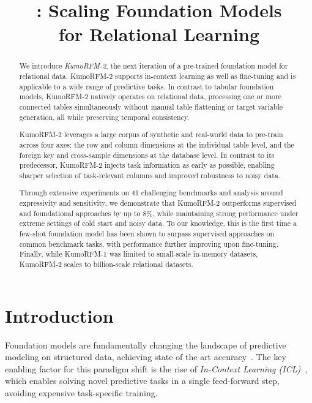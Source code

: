 \documentclass{article}
\title{
\nametwo{}: Scaling Foundation Models\\for Relational Learning
}
\newcommand{\onezero}{1\xspace}
\newcommand{\twozero}{2\xspace}
\newcommand{\name}{KumoRFM\xspace}
\newcommand{\nameone}{\name-\onezero}
\newcommand{\nametwo}{\name-\twozero}
\begin{document}
\maketitle

\begin{abstract}

We introduce \emph{\nametwo}, the next iteration of a pre-trained foundation model for relational data. \nametwo supports in-context learning as well as fine-tuning and is applicable to a wide range of predictive tasks.
In contrast to tabular foundation models, \nametwo natively operates on relational data, processing one or more connected tables simultaneously without manual table flattening or target variable generation, all while preserving temporal consistency.

\nametwo leverages a large corpus of synthetic and real-world data to pre-train across four axes: the row and column dimensions at the individual table level, and the foreign key and cross-sample dimensions at the database level.
In contrast to its predecessor, \nametwo injects task information as early as possible, enabling sharper selection of task-relevant columns and improved robustness to noisy data.

Through extensive experiments on 41 challenging benchmarks and analysis around expressivity and sensitivity, we demonstrate that \nametwo outperforms supervised and foundational approaches by up to 8\%, while maintaining strong performance under extreme settings of cold start and noisy data.
To our knowledge, this is the first time a few-shot foundation model has been shown to surpass supervised approaches on common benchmark tasks, with performance further improving upon fine-tuning.
Finally, while \nameone was limited to small-scale in-memory datasets, \nametwo scales to billion-scale relational datasets.

\end{abstract}

\section{Introduction}
\label{sec:introduction}

Foundation models are fundamentally changing the landscape of predictive modeling on structured data, achieving state of the art accuracy~\citep{tabicl,tabpfn, contexttab, garg2025realtabpfn, limix, fey2025kumorfm, qu2026tabiclv2}.
The key enabling factor for this paradigm shift is the rise of \emph{In-Context Learning (ICL)}~\citep{gpt3}, which enables solving novel predictive tasks in a single feed-forward step, avoiding expensive task-specific training.
\end{document}
